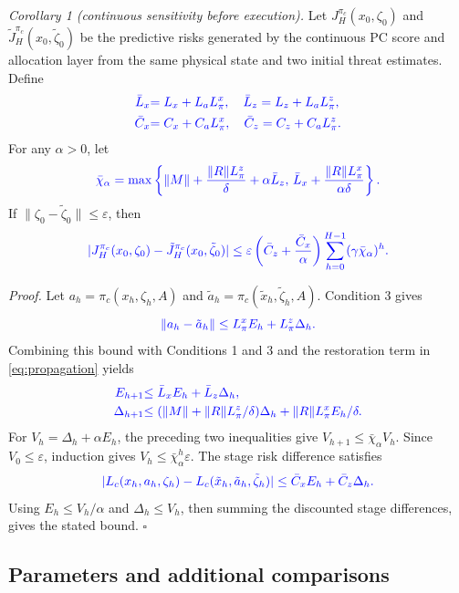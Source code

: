 \documentclass[journal]{IEEEtran}
\providecommand{\DIFadd}[1]{{\protect\color{blue}\uwave{#1}}} %
\renewcommand{\DIFadd}[1]{{\color{blue}#1}}
\begin{document}
\textit{\DIFadd{Corollary 1 (continuous sensitivity before execution).}}  \DIFadd{Let
$J_H^{\pi_c}(x_0,\zeta_0)$ and
$\tilde J_H^{\pi_c}(x_0,\tilde\zeta_0)$ be the predictive risks generated by
the continuous PC score and allocation layer from the same physical state and
two initial threat estimates.  Define
}\begin{align}
\DIFadd{\bar L_x}&\DIFadd{=L_x+L_aL_{\pi}^x,\quad
\bar L_z=L_z+L_aL_{\pi}^{z},}\\
\DIFadd{\bar C_x}&\DIFadd{=C_x+C_aL_{\pi}^x,\quad
\bar C_z=C_z+C_aL_{\pi}^{z}.
}\end{align}
\DIFadd{For any $\alpha>0$, let
}\begin{equation}
\DIFadd{\bar\chi_{\alpha}=
\max\left\{\|M\|+\frac{\|R\|L_{\pi}^{z}}{\delta}+\alpha\bar L_z,\,
\bar L_x+\frac{\|R\|L_{\pi}^{x}}{\alpha\delta}\right\}.
}\end{equation}
\DIFadd{If $\|\zeta_0-\tilde\zeta_0\|\le\varepsilon$, then
}\begin{equation}
\DIFadd{|J_H^{\pi_c}(x_0,\zeta_0)-\tilde J_H^{\pi_c}(x_0,\tilde\zeta_0)|
\le
\varepsilon\left(\bar C_z+\frac{\bar C_x}{\alpha}\right)
\sum_{h=0}^{H-1}(\gamma\bar\chi_{\alpha})^h .
}\end{equation}

\textit{\DIFadd{Proof.}}  \DIFadd{Let $a_h=\pi_c(x_h,\zeta_h,A)$ and
$\tilde a_h=\pi_c(\tilde x_h,\tilde\zeta_h,A)$.  Condition 3 gives
}\[
\DIFadd{\|a_h-\tilde a_h\|\le L_{\pi}^xE_h+L_{\pi}^{z}\Delta_h .
}\]
\DIFadd{Combining this bound with Conditions 1 and 3 and the restoration term in
\eqref{eq:propagation} yields
}\begin{align}
\DIFadd{E_{h+1}}&\DIFadd{\le \bar L_xE_h+\bar L_z\Delta_h,}\\
\DIFadd{\Delta_{h+1}}&\DIFadd{\le
(\|M\|+\|R\|L_{\pi}^{z}/\delta)\Delta_h
+\|R\|L_{\pi}^{x}E_h/\delta .
}\end{align}
\DIFadd{For $V_h=\Delta_h+\alpha E_h$, the preceding two inequalities give
$V_{h+1}\le\bar\chi_{\alpha}V_h$.  Since $V_0\le\varepsilon$, induction gives
$V_h\le\bar\chi_{\alpha}^h\varepsilon$.  The stage risk difference satisfies
}\[
\DIFadd{|L_c(x_h,a_h,\zeta_h)-L_c(\tilde x_h,\tilde a_h,\tilde\zeta_h)|
\le \bar C_xE_h+\bar C_z\Delta_h .
}\]
\DIFadd{Using $E_h\le V_h/\alpha$ and $\Delta_h\le V_h$, then summing the discounted
stage differences, gives the stated bound.  }\hfill \DIFadd{$\square$
}


\subsection{\DIFadd{Parameters and additional comparisons}}
\suppressfloats[t]
\end{document}
